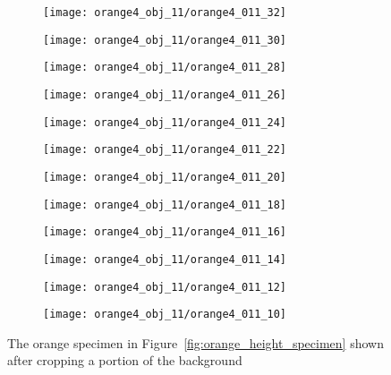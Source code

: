 \begin{figure*}
  \centering
  \begin{subfigure}[]{0.12\textwidth}
      \texttt{[image: orange4\_obj\_11/orange4\_011\_32]}
      \caption{}
  \end{subfigure}
  \begin{subfigure}[]{0.12\textwidth}
      \texttt{[image: orange4\_obj\_11/orange4\_011\_30]}
      \caption{}
  \end{subfigure}
  \begin{subfigure}[]{0.12\textwidth}
      \texttt{[image: orange4\_obj\_11/orange4\_011\_28]}
      \caption{}
  \end{subfigure}
  \begin{subfigure}[]{0.12\textwidth}
      \texttt{[image: orange4\_obj\_11/orange4\_011\_26]}
      \caption{}
  \end{subfigure}
  \begin{subfigure}[]{0.12\textwidth}
      \texttt{[image: orange4\_obj\_11/orange4\_011\_24]}
      \caption{}
  \end{subfigure}
  \begin{subfigure}[]{0.12\textwidth}
      \texttt{[image: orange4\_obj\_11/orange4\_011\_22]}
      \caption{}
  \end{subfigure}
  \begin{subfigure}[]{0.12\textwidth}
      \texttt{[image: orange4\_obj\_11/orange4\_011\_20]}
      \caption{}
  \end{subfigure}
  \begin{subfigure}[]{0.12\textwidth}
      \texttt{[image: orange4\_obj\_11/orange4\_011\_18]}
      \caption{}
  \end{subfigure}
  \begin{subfigure}[]{0.12\textwidth}
      \texttt{[image: orange4\_obj\_11/orange4\_011\_16]}
      \caption{}
  \end{subfigure}
  \begin{subfigure}[]{0.12\textwidth}
      \texttt{[image: orange4\_obj\_11/orange4\_011\_14]}
      \caption{}
  \end{subfigure}
  \begin{subfigure}[]{0.12\textwidth}
      \texttt{[image: orange4\_obj\_11/orange4\_011\_12]}
      \caption{}
  \end{subfigure}
  \begin{subfigure}[]{0.12\textwidth}
      \texttt{[image: orange4\_obj\_11/orange4\_011\_10]}
      \caption{}
  \end{subfigure}
\caption[Images of an orange specimen after cropping a portion of background]{The orange specimen in Figure~\ref{fig:orange_height_specimen} shown after cropping a portion of the background}
\label{fig:orange_height_specimen_cropped}
\end{figure*}	


